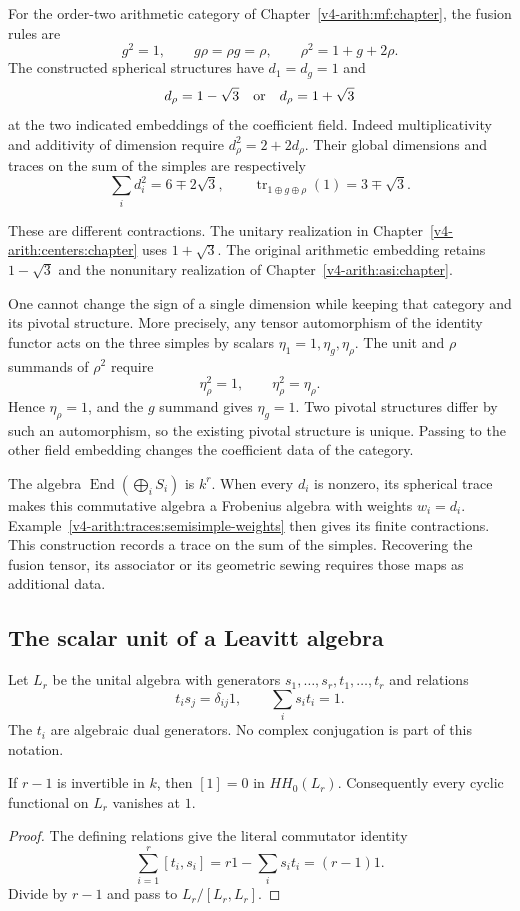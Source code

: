 For the order-two arithmetic category of Chapter~\ref{v4-arith:mf:chapter},
the fusion rules are
\[
 g^2=1,\qquad g\rho=\rho g=\rho,\qquad
 \rho^2=1+g+2\rho.
\]
The constructed spherical structures have $d_1=d_g=1$ and
\[
 d_\rho=1-\sqrt3
 \quad\hbox{or}\quad
 d_\rho=1+\sqrt3
\]
at the two indicated embeddings of the coefficient field. Indeed
multiplicativity and additivity of dimension require $d_\rho^2=2+2d_\rho$.
Their global dimensions and traces on the sum of the simples are
respectively
\[
 \sum_i d_i^2=6\mp2\sqrt3,\qquad
 \operatorname{tr}_{1\oplus g\oplus\rho}(1)=3\mp\sqrt3.
\]

These are different contractions. The unitary realization in
Chapter~\ref{v4-arith:centers:chapter} uses $1+\sqrt3$. The original
arithmetic embedding retains $1-\sqrt3$ and the nonunitary realization of
Chapter~\ref{v4-arith:asi:chapter}.

One cannot change the sign of a single dimension while keeping that category
and its pivotal structure. More precisely, any tensor automorphism of the
identity functor acts on the three simples by scalars
$\eta_1=1,\eta_g,\eta_\rho$. The unit and $\rho$ summands of $\rho^2$
require
\[
 \eta_\rho^2=1,\qquad \eta_\rho^2=\eta_\rho.
\]
Hence $\eta_\rho=1$, and the $g$ summand gives $\eta_g=1$. Two pivotal
structures differ by such an automorphism, so the existing pivotal structure
is unique. Passing to the other field embedding changes the coefficient data
of the category.

The algebra $\operatorname{End}(\bigoplus_i S_i)$ is $k^r$. When every $d_i$
is nonzero, its spherical trace makes this commutative algebra a Frobenius
algebra with weights $w_i=d_i$.
Example~\ref{v4-arith:traces:semisimple-weights} then gives its finite
contractions. This construction records a trace on the sum of the simples.
Recovering the fusion tensor, its associator or its geometric sewing
requires those maps as additional data.

\subsection{The scalar unit of a Leavitt algebra}

Let $L_r$ be the unital algebra with generators
$s_1,\ldots,s_r,t_1,\ldots,t_r$ and relations
\[
 t_is_j=\delta_{ij}1,\qquad \sum_i s_it_i=1.
\]
The $t_i$ are algebraic dual generators. No complex conjugation is part of
this notation.

\begin{proposition}
\label{v4-arith:traces:leavitt-unit}
If $r-1$ is invertible in $k$, then $[1]=0$ in $HH_0(L_r)$. Consequently
every cyclic functional on $L_r$ vanishes at $1$.
\end{proposition}
\begin{proof}
The defining relations give the literal commutator identity
\[
 \sum_{i=1}^r[t_i,s_i]
   =r1-\sum_i s_it_i=(r-1)1.
\]
Divide by $r-1$ and pass to $L_r/[L_r,L_r]$.
\end{proof}

